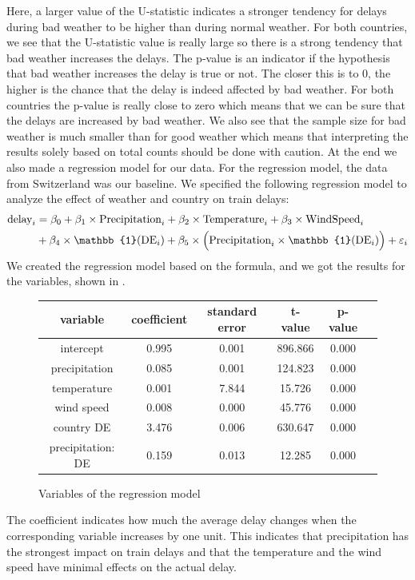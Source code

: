 Here, a larger value of the U-statistic indicates a stronger tendency for delays during bad weather to be higher than during normal weather.
For both countries, we see that the U-statistic value is really large so there is a strong tendency that bad weather increases the delays.
The p-value is an indicator if the hypothesis that bad weather increases the delay is true or not.
The closer this is to 0, the higher is the chance
that the delay is indeed affected by bad weather.
For both countries the p-value is really close to zero which means that we can be sure
that the delays are increased by bad weather.
We also see that the sample size for bad weather is much smaller than for good weather which means that interpreting the results solely based on total counts should be done with caution. \newline \newline
At the end we also made a regression model for our data.
For the regression model, the data from Switzerland was our baseline.
We specified the following regression model to analyze the effect of weather and country on train delays:
\begin{align*}
\text{delay}_i &= \beta_{0} + \beta_{1} \times \text{Precipitation}_i + \beta_{2} \times \text{Temperature}_i \nonumber + \beta_{3} \times \text{WindSpeed}_i\\
    &+ \beta_{4} \times \mathbb{1}(\text{DE}_i) + \beta_{5} \times \Bigl(\text{Precipitation}_i \times \mathbb{1}(\text{DE}_i)\Bigr) + \varepsilon_i
\label{eq:reg_model}
\end{align*}
We created the regression model based on the formula, and we got the results for the variables, shown in .
\begin{figure}[!ht]
    \centering
    \begin{tabular}{|c|c|c|c|c|c|}
        \hline
        variable & coefficient & standard error & t-value & p-value\\
        \hline
        intercept & 0.995 & 0.001 & 896.866 & 0.000\\
        \hline
        precipitation & 0.085 & 0.001 & 124.823 & 0.000\\
        \hline
        temperature & 0.001 & 7.844 & 15.726 & 0.000\\
        \hline
        wind speed & 0.008 & 0.000 & 45.776 & 0.000\\
        \hline
        country DE & 3.476 & 0.006 & 630.647 & 0.000\\
        \hline
        precipitation: DE & 0.159 & 0.013 & 12.285 & 0.000\\
        \hline
    \end{tabular}
    \caption{Variables of the regression model}
    \label{fig:g5_reg_model}
\end{figure}
The coefficient indicates how much the average delay changes when the corresponding variable increases by one unit.
This indicates that precipitation has the strongest impact on train delays and that the temperature and the wind speed have minimal effects on the actual delay.


